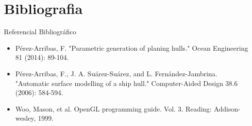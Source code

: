\documentclass{beamer}
\begin{document}
\section{Bibliografia}
\begin{frame}{Referencial Bibliográfico}
\begin{itemize}
	\item Pérez-Arribas, F. "Parametric generation of planing hulls." Ocean Engineering 81 (2014): 89-104.
	\medskip
	\item Pérez-Arribas, F., J. A. Suárez-Suárez, and L. Fernández-Jambrina. "Automatic surface modelling of a ship hull." Computer-Aided Design 38.6 (2006): 584-594.
	\medskip
	\item Woo, Mason, et al. OpenGL programming guide. Vol. 3. Reading: Addison-wesley, 1999.
\end{itemize}
\end{frame}
\begin{frame}
\titlepage
\end{frame}
\end{document}
